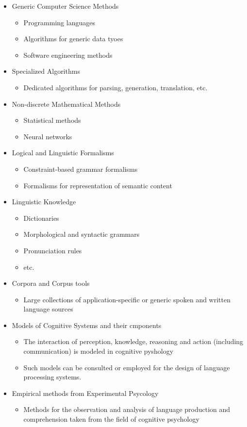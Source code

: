\documentclass[11pt]{article}
\newenvironment{itemise}{
\begin{itemize}
  \setlength{\itemsep}{1pt}
  \setlength{\parskip}{0pt}
  \setlength{\parsep}{0pt}
}{\end{itemize}}
\begin{document}
\begin{itemise}
 \item Generic Computer Science Methods
\begin{itemise}
 \item Programming languages
 \item Algorithms for generic data tyoes
 \item Software engineering methods
\end{itemise}
 \item Specialized Algorithms
\begin{itemise}
 \item Dedicated algorithms for parsing, generation, translation, etc.
\end{itemise}
 \item Non-discrete Mathematical Methods
\begin{itemise}
 \item Statistical methods
 \item Neural networks
\end{itemise}
 \item Logical and Linguistic Formalisms
\begin{itemise}
 \item Constraint-based grammar formalisms
 \item Formalisms for representation of semantic content
\end{itemise}
 \item Linguistic Knowledge
\begin{itemise}
 \item Dictionaries
 \item Morphological and syntactic grammars
 \item Pronunciation rules
 \item etc.
\end{itemise}
 \item Corpora and Corpus tools
\begin{itemise}
 \item Large collections of application-specific or generic spoken and written language sources
\end{itemise}
 \item Models of Cognitive Systems and their cmponents
\begin{itemise}
 \item The interaction of perception, knowledge, reasoning and action (including communication) is modeled in cognitive pyshology
 \item Such models can be consulted or employed for the design of language processing systems.
\end{itemise}
 \item Empirical methods from Experimental Psycology
\begin{itemise}
 \item Methods for the observation and analysis of language production and comprehension taken from the field of cognitive psychology
\end{itemise}
\end{itemise}
\end{document}
